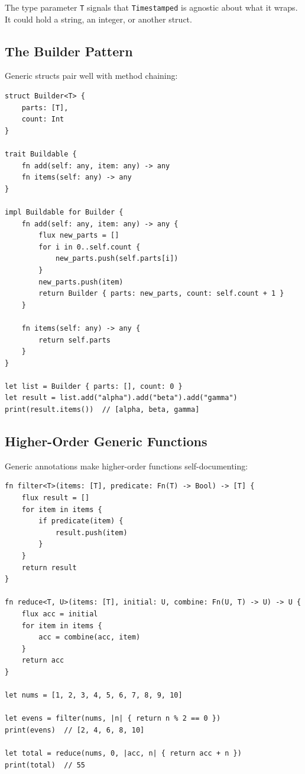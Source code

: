 The type parameter \lstinline|T| signals that \lstinline|Timestamped| is
agnostic about what it wraps. It could hold a string, an integer, or another
struct.

\subsection{The Builder Pattern}

Generic structs pair well with method chaining:

\begin{lstlisting}[language=Lattice, caption={A generic builder}]
struct Builder<T> {
    parts: [T],
    count: Int
}

trait Buildable {
    fn add(self: any, item: any) -> any
    fn items(self: any) -> any
}

impl Buildable for Builder {
    fn add(self: any, item: any) -> any {
        flux new_parts = []
        for i in 0..self.count {
            new_parts.push(self.parts[i])
        }
        new_parts.push(item)
        return Builder { parts: new_parts, count: self.count + 1 }
    }

    fn items(self: any) -> any {
        return self.parts
    }
}

let list = Builder { parts: [], count: 0 }
let result = list.add("alpha").add("beta").add("gamma")
print(result.items())  // [alpha, beta, gamma]
\end{lstlisting}

\subsection{Higher-Order Generic Functions}

Generic annotations make higher-order functions self-documenting:

\begin{lstlisting}[language=Lattice, caption={Generic filter and reduce}]
fn filter<T>(items: [T], predicate: Fn(T) -> Bool) -> [T] {
    flux result = []
    for item in items {
        if predicate(item) {
            result.push(item)
        }
    }
    return result
}

fn reduce<T, U>(items: [T], initial: U, combine: Fn(U, T) -> U) -> U {
    flux acc = initial
    for item in items {
        acc = combine(acc, item)
    }
    return acc
}

let nums = [1, 2, 3, 4, 5, 6, 7, 8, 9, 10]

let evens = filter(nums, |n| { return n % 2 == 0 })
print(evens)  // [2, 4, 6, 8, 10]

let total = reduce(nums, 0, |acc, n| { return acc + n })
print(total)  // 55
\end{lstlisting}

